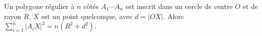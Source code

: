 Un polygone régulier à $n$ côtés $A_1 \cdots A_n$ est inscrit dans un cercle de centre $O$ et de rayon $R$. $X$ est un point quelconque, avec $d = |OX|$. Alors $\sum_{i=1}^n |A_iX|^2 = n(R^2 + d^2)$.
